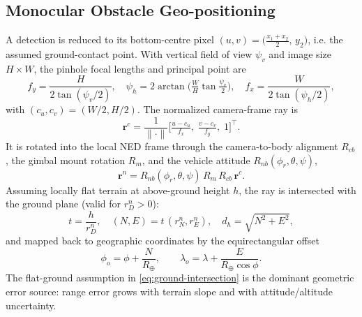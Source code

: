 \subsection{Monocular Obstacle Geo-positioning}
A detection is reduced to its bottom-centre pixel
$(u,v)=\!\big(\tfrac{x_1+x_2}{2},\,y_2\big)$, i.e. the assumed ground-contact
point. With vertical field of view $\psi_v$ and image size $H\times W$, the
pinhole focal lengths and principal point are
\begin{equation}
f_y=\frac{H}{2\tan(\psi_v/2)},\quad
\psi_h=2\arctan\!\Big(\tfrac{W}{H}\tan\tfrac{\psi_v}{2}\Big),\quad
f_x=\frac{W}{2\tan(\psi_h/2)},
\end{equation}
with $(c_u,c_v)=(W/2,H/2)$. The normalized camera-frame ray is
\begin{equation}
\mathbf r^{c}=\frac{1}{\lVert\cdot\rVert}
\Big[\tfrac{u-c_u}{f_x},\;\tfrac{v-c_v}{f_y},\;1\Big]^{\!\top}.
\end{equation}
It is rotated into the local NED frame through the camera-to-body alignment
$R_{cb}$, the gimbal mount rotation $R_{m}$, and the vehicle attitude
$R_{nb}(\phi_r,\theta,\psi)$,
\begin{equation}
\mathbf r^{n}=R_{nb}(\phi_r,\theta,\psi)\,R_{m}\,R_{cb}\,\mathbf r^{c}.
\end{equation}
Assuming locally flat terrain at above-ground height $h$, the ray is
intersected with the ground plane (valid for $r^{n}_{D}>0$):
\begin{equation}
t=\frac{h}{r^{n}_{D}},\quad
(N,E)=t\,(r^{n}_{N},r^{n}_{E}),\quad
d_h=\sqrt{N^2+E^2},
\label{eq:ground-intersection}
\end{equation}
and mapped back to geographic coordinates by the equirectangular offset
\begin{equation}
\phi_o=\phi+\frac{N}{R_\oplus},\qquad
\lambda_o=\lambda+\frac{E}{R_\oplus\cos\phi}.
\end{equation}
The flat-ground assumption in \eqref{eq:ground-intersection} is the dominant
geometric error source: range error grows with terrain slope and with
attitude/altitude uncertainty.

